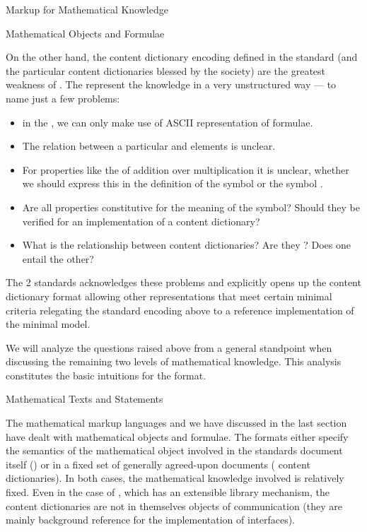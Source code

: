 \begin{tchapter}[id=math-markup]{Markup for Mathematical Knowledge}
\begin{tsection}[id=math-objects]{Mathematical Objects and Formulae}
\begin{tsubsection}[id=math-markup:openmath]{\openmath}
  On the other hand, the content dictionary encoding defined in the {\openmath} standard
  (and the particular content dictionaries blessed by the {\openmath} society) are the
  greatest weakness of {\openmath}.  The represent the knowledge in a very unstructured
  way --- to name just a few problems:
  \begin{itemize}
  \item in the {}, we can only make use of ASCII representation
    of formulae.
  \item The relation between a particular {} and
    {} elements is unclear.
  \item For properties like the {} of addition over
    multiplication it is unclear, whether we should express this in the definition of the
    symbol {} or the symbol {}.
  \item Are all properties constitutive{} for the meaning of
    the symbol? Should they be verified for an implementation of a content dictionary?
  \item What is the relationship between content dictionaries? Are they
    {}?  Does one entail the other?
  \end{itemize}
  The {\openmath}2 standards acknowledges these problems and explicitly opens up the
  content dictionary format allowing other representations that meet certain minimal
  criteria relegating the standard encoding above to a reference implementation of the
  minimal model.

  We will analyze the questions raised above from a general standpoint when discussing the
  remaining two levels of mathematical knowledge. This analysis constitutes the basic
  intuitions for the {\omdoc} format.
\end{tsubsection}
\end{tsection}

\begin{tsection}[id=meta-math]{Mathematical Texts and Statements}

  The mathematical markup languages {\openmath} and {\mathml} we have discussed in the
  last section have dealt with mathematical objects and formulae. The formats either
  specify the semantics of the mathematical object involved in the standards document
  itself ({\mathml}) or in a fixed set of generally agreed-upon documents ({\openmath}
  content dictionaries). In both cases, the mathematical
  knowledge involved is relatively fixed. Even in the case of {\openmath}, which has an
  extensible library mechanism, the content dictionaries are not in themselves objects of
  communication (they are mainly background reference for the implementation of
  {\openmath} interfaces).


\end{tsection}
\end{tchapter}
